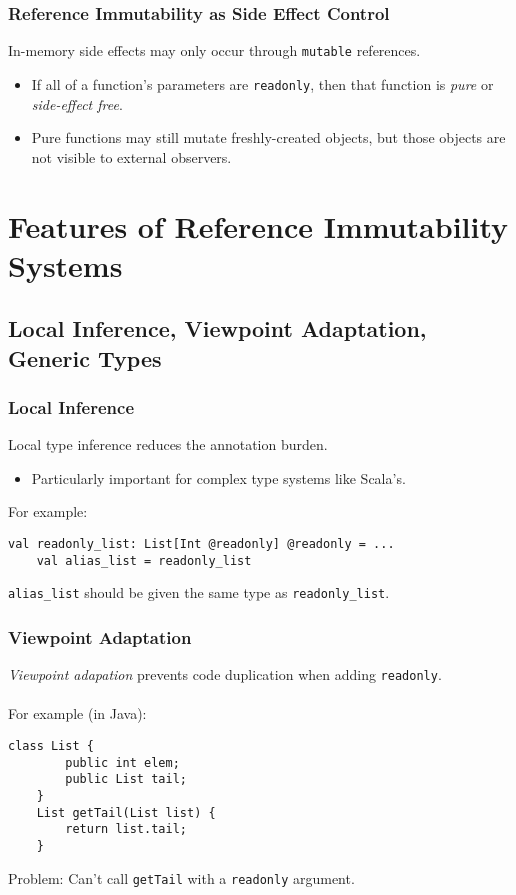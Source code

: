 \documentclass{beamer}
\newcommand{\code}[1]{\lstinline$#1$}
\begin{document}
\begin{frame}[containsverbatim]
\frametitle{Reference Immutability as Side Effect Control}
In-memory side effects may only occur through \code{mutable} references.
\begin{itemize}
\item If all of a function's parameters are \code{readonly}, then
	that function is \emph{pure} or \emph{side-effect free}.
\item Pure functions may still mutate freshly-created objects,
	but those objects are not visible to external observers.
\end{itemize}
\end{frame}




\section{Features of Reference Immutability Systems}

	\subsection{Local Inference, Viewpoint Adaptation, Generic Types}
	
	
\begin{frame}[containsverbatim]   %
\frametitle{Local Inference}
Local type inference reduces the annotation burden.
\begin{itemize}
\item Particularly important for complex type systems like Scala's.
\end{itemize}
For example:
\begin{lstlisting}[escapechar=`]
	val readonly_list: List[Int @readonly] @readonly = ...
	val alias_list = readonly_list
\end{lstlisting}
\code{alias_list} should be given the same type as \code{readonly_list}.
\end{frame}

\begin{frame}[containsverbatim]   %
\frametitle{Viewpoint Adaptation}
\emph{Viewpoint adapation} prevents code duplication when adding \code{readonly}.
\\\hfill\\
For example (in Java):
\begin{lstlisting}[escapechar=`]
	class List {
		public int elem;
		public List tail;
	}
	List getTail(List list) {
		return list.tail;
	}
\end{lstlisting}
\redcolor Problem: Can't call \code{getTail} with a \code{readonly} argument. \blackcolor
\end{frame}
\end{document}
